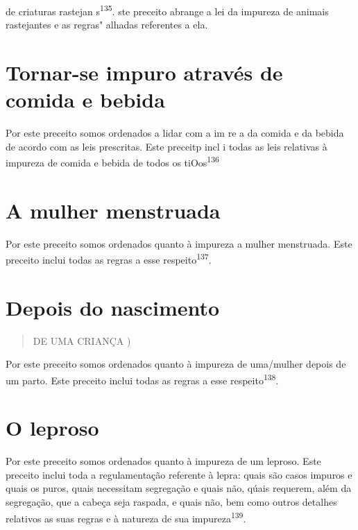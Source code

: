 de criaturas rastejan s\textsuperscript{135}. ste preceito abrange a lei
da impureza de animais rastejantes e as regras" alhadas referentes a
ela.

\section{Tornar-se impuro através de comida e bebida}

Por este preceito somos ordenados a lidar com a im re a da comi­da e da
bebida de acordo com as leis prescritas. Este preceitp incl i todas as
leis relativas à impureza de comida e bebida de todos os
tiOos\textsuperscript{136}

\section{A mulher menstruada}

Por este preceito somos ordenados quanto à impureza a mulher menstruada.
Este preceito inclui todas as regras a esse
respeito\textsuperscript{137}.

\section{Depois do nascimento}

\begin{quote}
DE UMA CRIANÇA )
\end{quote}

Por este preceito somos ordenados quanto à impureza de uma/mu­lher
depois de um parto. Este preceito inclui todas as regras a esse
respeito\textsuperscript{138}.

\section{O leproso}

Por este preceito somos ordenados quanto à impureza de um lepro­so. Este
preceito inclui toda a regulamentação referente à lepra: quais são casos
impuros e quais os puros, quais necessitam segregação e quais não, qúais
requerem, além da segregação, que a cabeça seja raspada, e quais não,
bem co­mo outros detalhes relativos as suas regras e à natureza de sua
impureza\textsuperscript{139}.

